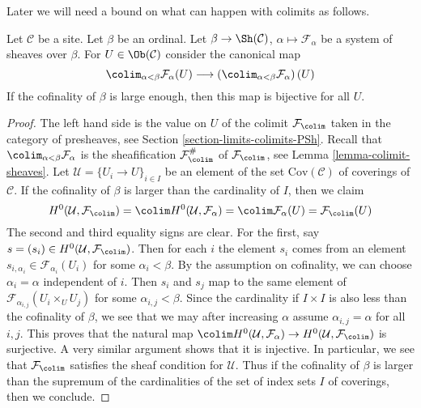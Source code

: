 \noindent
Later we will need a bound on what can happen with colimits as follows.

\begin{lemma}
\label{lemma-colimit-over-ordinal-sections}
Let $\mathcal{C}$ be a site. Let $\beta$ be an ordinal.
Let $\beta \to \Sh(\mathcal{C})$, $\alpha \mapsto \mathcal{F}_\alpha$
be a system of sheaves over $\beta$. For $U \in \Ob(\mathcal{C})$
consider the canonical map
$$
\colim_{\alpha < \beta} \mathcal{F}_\alpha(U)
\longrightarrow
\left(\colim_{\alpha < \beta} \mathcal{F}_\alpha \right)(U)
$$
If the cofinality of $\beta$ is large enough, then this map
is bijective for all $U$.
\end{lemma}

\begin{proof}
The left hand side is the value on $U$ of the colimit $\mathcal{F}_{\colim}$
taken in the category of presheaves, see
Section \ref{section-limits-colimits-PSh}.
Recall that $\colim_{\alpha < \beta} \mathcal{F}_\alpha$ is the
sheafification $\mathcal{F}_{\colim}^\#$ of $\mathcal{F}_{\colim}$, see
Lemma \ref{lemma-colimit-sheaves}.
Let $\mathcal{U} = \{U_i \to U\}_{i \in I}$ be an element of the
set $\text{Cov}(\mathcal{C})$ of coverings of $\mathcal{C}$.
If the cofinality of $\beta$ is larger than the
cardinality of $I$, then we claim
$$
H^0(\mathcal{U}, \mathcal{F}_{\colim}) =
\colim H^0(\mathcal{U}, \mathcal{F}_\alpha) =
\colim \mathcal{F}_\alpha(U) = \mathcal{F}_{\colim}(U)
$$
The second and third equality signs are clear. For the first, say
$s = (s_i) \in H^0(\mathcal{U}, \mathcal{F}_{\colim})$.
Then for each $i$ the element $s_i$ comes from an element
$s_{i, \alpha_i} \in \mathcal{F}_{\alpha_i}(U_i)$ for some
$\alpha_i < \beta$. By the assumption on cofinality, we can choose
$\alpha_i = \alpha$ independent of $i$. Then $s_i$ and $s_j$
map to the same element of $\mathcal{F}_{\alpha_{i, j}}(U_i \times_U U_j)$
for some $\alpha_{i, j} < \beta$. Since the cardinality if
$I \times I$ is also less than the cofinality of $\beta$, we see
that we may after increasing $\alpha$ assume $\alpha_{i, j} = \alpha$
for all $i, j$. This proves that the natural map
$\colim H^0(\mathcal{U}, \mathcal{F}_\alpha)
\to H^0(\mathcal{U}, \mathcal{F}_{\colim})$ is surjective.
A very similar argument shows that it is injective.
In particular, we see that $\mathcal{F}_{\colim}$ satisfies
the sheaf condition for $\mathcal{U}$.
Thus if the cofinality of $\beta$ is larger than the
supremum of the cardinalities of the set of index sets $I$
of coverings, then we conclude.
\end{proof}






